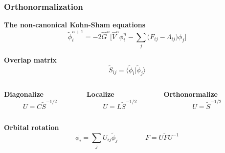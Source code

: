 \documentclass[mathserif, 10pt]{beamer}
\begin{document}
\begin{frame}
    \frametitle{Orthonormalization}
    \centering
    \textbf{The non-canonical Kohn-Sham equations}
    \begin{equation}
        \nonumber
        \tilde{\phi}_i^{n+1} = -2\hat{G}^n \bigg[\hat{V}^n\phi_i^n -
        \sum_j\big(F_{ij} - \Lambda_{ij}\big)\phi_j\bigg]
    \end{equation}
    
    \vspace{10mm}

    \textbf{Overlap matrix}
    \begin{equation}
        \nonumber
        \tilde{S}_{ij} = \langle\tilde{\phi}_i|\tilde{\phi}_j\rangle
    \end{equation}

    \vspace{10mm}

    \begin{columns}
    \begin{column}[b]{0.3\linewidth}
    \centering
    \textbf{Diagonalize}
    \begin{equation}
	\nonumber
        U = C\tilde{S}^{-1/2}
    \end{equation}
    \end{column}

    \begin{column}[b]{0.4\linewidth}
    \centering
    \textbf{Localize}
    \begin{equation}
	\nonumber
        U = L\tilde{S}^{-1/2}
    \end{equation}
    \end{column}

    \begin{column}[b]{0.3\linewidth}
    \centering
    \textbf{Orthonormalize}
    \begin{equation}
	\nonumber
        U = \tilde{S}^{-1/2}
    \end{equation}
    \end{column}
    \end{columns}

    \vspace{10mm}

    \centering
    \textbf{Orbital rotation}
    \begin{equation}
	\nonumber
	\phi_i = \sum_j U_{ij} \tilde{\phi}_j \qquad \qquad F = U\tilde{F}U^{-1}
    \end{equation}
\end{frame}
\end{document}

